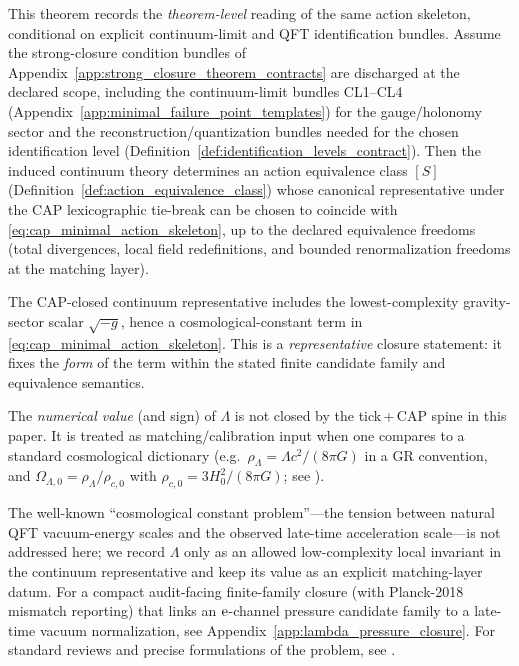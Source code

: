 \begin{theorem}
\label{thm:unified_continuum_action_theorem_level_template}
\AuditTag This theorem records the \emph{theorem-level} reading of the same action skeleton, conditional on explicit continuum-limit and QFT identification bundles.
Assume the strong-closure condition bundles of Appendix~\ref{app:strong_closure_theorem_contracts} are discharged at the declared scope, including the continuum-limit bundles CL1--CL4 (Appendix~\ref{app:minimal_failure_point_templates}) for the gauge/holonomy sector and the reconstruction/quantization bundles needed for the chosen identification level (Definition~\ref{def:identification_levels_contract}).
Then the induced continuum theory determines an action equivalence class $[S]$ (Definition~\ref{def:action_equivalence_class}) whose canonical representative under the CAP lexicographic tie-break can be chosen to coincide with \eqref{eq:cap_minimal_action_skeleton}, up to the declared equivalence freedoms (total divergences, local field redefinitions, and bounded renormalization freedoms at the matching layer).
\end{theorem}

\begin{remark}\label{rem:lambda_status}
\InterfaceTag The CAP-closed continuum representative includes the lowest-complexity gravity-sector scalar $\sqrt{-g}$, hence a cosmological-constant term in \eqref{eq:cap_minimal_action_skeleton}.
This is a \emph{representative} closure statement: it fixes the \emph{form} of the term within the stated finite candidate family and equivalence semantics.

\MatchTag The \emph{numerical value} (and sign) of $\Lambda$ is not closed by the tick\,+\,CAP spine in this paper.
It is treated as matching/calibration input when one compares to a standard cosmological dictionary (e.g.\ $\rho_\Lambda=\Lambda c^2/(8\pi G)$ in a GR convention, and $\Omega_{\Lambda,0}=\rho_\Lambda/\rho_{c,0}$ with $\rho_{c,0}=3H_0^2/(8\pi G)$; see \cite{Planck2018Parameters}).

\AuditTag The well-known ``cosmological constant problem''---the tension between natural QFT vacuum-energy scales and the observed late-time acceleration scale---is not addressed here; we record $\Lambda$ only as an allowed low-complexity local invariant in the continuum representative and keep its value as an explicit matching-layer datum.
\AuditTag For a compact audit-facing finite-family closure (with Planck-2018 mismatch reporting) that links an $\mathrm{e}$-channel pressure candidate family to a late-time vacuum normalization, see Appendix~\ref{app:lambda_pressure_closure}.
For standard reviews and precise formulations of the problem, see \cite{Weinberg1989CosmologicalConstant,Carroll2001CosmologicalConstant,Martin2012CosmologicalConstantProblem}.
\end{remark}

